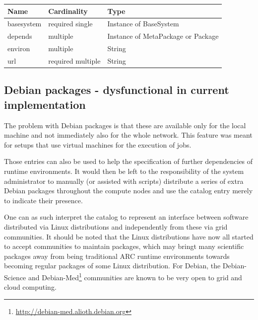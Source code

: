 {\begin{table}[!h]
   \begin{center}
         \label{tab:main_class_tar}
	\begin{tabular}{p{3cm}p{3cm}p{6cm}}
	\textbf{Name}  & \textbf{Cardinality}  & \textbf{Type}\\
	\hline
	basesystem     & required single       & Instance of BaseSystem       \\
	depends        & multiple              & Instance of MetaPackage or Package      \\
	environ        & multiple              & String       \\
	url            & required multiple     & String      \\
	\end{tabular} 
   \end{center}
\end{table}

\subsection{Debian packages - dysfunctional in current implementation}

The problem with Debian packages is that these are available only for the
local machine and not immediately also for the whole network. This feature
was meant for setups that use virtual machines for the execution of jobs.

Those entries can also be used to help the specification of further
dependencies of runtime environments. It would then be left to the
responsibility of the system administrator to manually (or assisted with
scripts) distribute a series of extra Debian packages throughout the
compute nodes and use the catalog entry merely to indicate their presence.

One can as such interpret the catalog to represent an interface between
software distributed via Linux distributions and independently from these
via grid communities. It should be noted that the Linux distributions
have now all started to accept communities to maintain packages, which
may bringt many scientific packages away from being traditional ARC 
runtime environments towards becoming regular packages of some Linux
distribution. For Debian, the Debian-Science and
Debian-Med\footnote{\href{http://debian-med.alioth.debian.org}{http://debian-med.alioth.debian.org}}
communities are known to be very open to grid and cloud computing.

}
